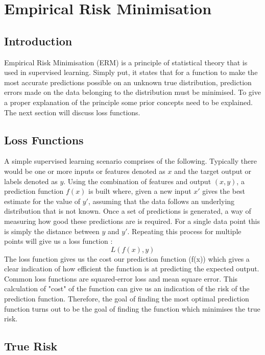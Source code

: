 \chapter{Empirical Risk Minimisation}
\label{ch:empirical-risk-minimisation}


\section{Introduction}
Empirical Risk Minimisation (ERM) is a principle of statistical theory that is used in supervised learning. Simply put, it states that for a function to make the most accurate predictions possible on an unknown true distribution, prediction errors made on the data belonging to the distribution must be minimised. To give a proper explanation of the principle some prior concepts need to be explained. The next section will discuss loss functions. 

\section{Loss Functions}
A simple supervised learning scenario comprises of the following. Typically there would be one or more inputs or features denoted as $x$ and the target output or labels denoted as $y$.
Using the combination of features and output $(x,y)$, a prediction function $f(x)$ is built where, given a new input $x'$ gives the best estimate for the value of $y'$, assuming that the data follows an underlying distribution that is not known. Once a set of predictions is generated, a way of measuring how good these predictions are is required. For a single data point this is simply the distance between $y$ and $y'$. Repeating this process for multiple points will give us a loss function \citep{Wehenkel2018}:
\begin{equation}
    L(f(x),y)
\end{equation}
The loss function gives us the cost our prediction function (f(x)) which gives a clear indication of how efficient the function is at predicting the expected output. Common loss functions are squared-error loss  and mean square error. This calculation of "cost" of the function can give us an indication of the risk of the prediction function. Therefore, the goal of finding the most optimal prediction function turns out to be the goal of finding the function which minimises the true risk.

\section{True Risk}

